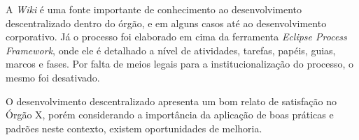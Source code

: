 A \textit{Wiki} é uma fonte importante de conhecimento ao desenvolvimento descentralizado dentro do órgão, e em alguns casos até ao desenvolvimento corporativo. Já o processo foi elaborado em cima da ferramenta \textit{Eclipse Process Framework}, onde ele é detalhado a nível de atividades, tarefas, papéis, guias, marcos e fases. Por falta de meios legais para a institucionalização do processo, o mesmo foi desativado.

O desenvolvimento descentralizado apresenta um bom relato de satisfação no Órgão X, porém considerando a importância da aplicação de boas práticas e padrões neste contexto, existem oportunidades de melhoria.

